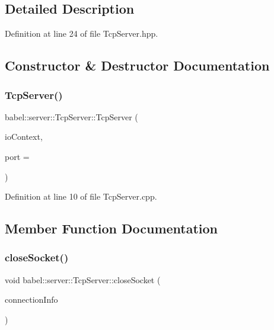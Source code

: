 \subsection{Detailed Description}


Definition at line 24 of file Tcp\+Server.\+hpp.



\subsection{Constructor \& Destructor Documentation}
\mbox{\label{classbabel_1_1server_1_1_tcp_server_a34d6d6ce02cedfe4dd3c39f89870d9f2}} 
\subsubsection{\texorpdfstring{Tcp\+Server()}{TcpServer()}}
{\footnotesize\ttfamily babel\+::server\+::\+Tcp\+Server\+::\+Tcp\+Server (\begin{DoxyParamCaption}\item[{boost\+::asio\+::io\+\_\+context \&}]{io\+Context,  }\item[{uint16\+\_\+t}]{port = {} }\end{DoxyParamCaption})\hspace{0.3cm}{\ttfamily [explicit]}}



Definition at line 10 of file Tcp\+Server.\+cpp.



\subsection{Member Function Documentation}
\mbox{\label{classbabel_1_1server_1_1_tcp_server_afca52d128850b14d4f6a69bd2d9fe877}} 
\subsubsection{\texorpdfstring{close\+Socket()}{closeSocket()}}
{\footnotesize\ttfamily void babel\+::server\+::\+Tcp\+Server\+::close\+Socket (\begin{DoxyParamCaption}\item[{\mbox{\hyperlink{classbabel_1_1common_1_1_connection_info}{common\+::\+Connection\+Info}}}]{connection\+Info }\end{DoxyParamCaption})}



